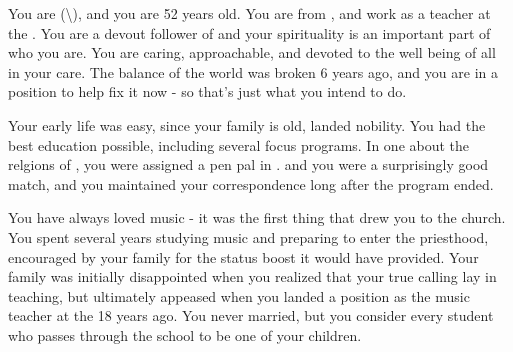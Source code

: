 \documentclass[char]{GL2020}
\begin{document}
\name{\cMusic{}}



You are \cMusic{} (\cMusic{\they}\textbackslash\cMusic{\them}), and you are 52 years old. You are from \pFarm{}, and work as a teacher at the \pSchool{}. You are a devout follower of \cFarmGod{} and your spirituality is an important part of who you are. You are caring, approachable, and devoted to the well being of all in your care. The balance of the world was broken 6 years ago, and you are in a position to help fix it now - so that's just what you intend to do.



Your early life was easy, since your family is old, landed nobility. You had the best education possible, including several focus programs. In one about the relgions of \pEarth{}, you were assigned a pen pal in \pTech{}. \cBeetle{} and you were a surprisingly good match, and you maintained your correspondence long after the program ended. 

You have always loved music - it was the first thing that drew you to the church. You spent several years studying music and preparing to enter the priesthood, encouraged by your family for the status boost it would have provided. Your family was initially disappointed when you realized that your true calling lay in teaching, but ultimately appeased when you landed a position as the music teacher at the \pSchool{} 18 years ago. You never married, but you consider every student who passes through the school to be one of your children.

\end{document}
